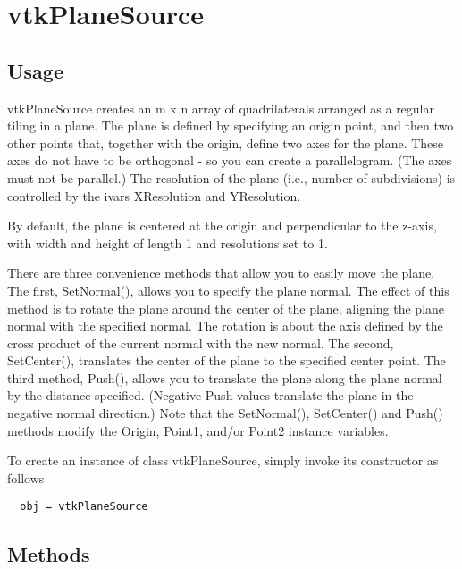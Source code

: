 \section{vtkPlaneSource}

\subsection{Usage}

 vtkPlaneSource creates an m x n array of quadrilaterals arranged as
 a regular tiling in a plane. The plane is defined by specifying an
 origin point, and then two other points that, together with the
 origin, define two axes for the plane. These axes do not have to be
 orthogonal - so you can create a parallelogram. (The axes must not
 be parallel.) The resolution of the plane (i.e., number of subdivisions) is
 controlled by the ivars XResolution and YResolution.

 By default, the plane is centered at the origin and perpendicular to the
 z-axis, with width and height of length 1 and resolutions set to 1.

 There are three convenience methods that allow you to easily move the
 plane.  The first, SetNormal(), allows you to specify the plane
 normal. The effect of this method is to rotate the plane around the center
 of the plane, aligning the plane normal with the specified normal. The
 rotation is about the axis defined by the cross product of the current
 normal with the new normal. The second, SetCenter(), translates the center
 of the plane to the specified center point. The third method, Push(),
 allows you to translate the plane along the plane normal by the distance
 specified. (Negative Push values translate the plane in the negative
 normal direction.)  Note that the SetNormal(), SetCenter() and Push()
 methods modify the Origin, Point1, and/or Point2 instance variables.

To create an instance of class vtkPlaneSource, simply
invoke its constructor as follows
\begin{verbatim}
  obj = vtkPlaneSource
\end{verbatim}
\subsection{Methods}

